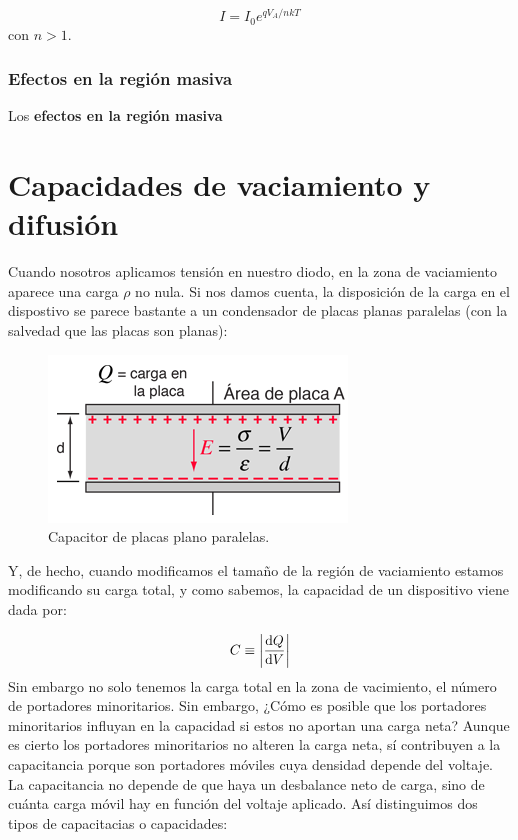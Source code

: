 \begin{equation}
    I = I_0 e^{qV_A/nkT}
\end{equation}
con $n>1$.

\subsubsection{Efectos en la región masiva}

Los \textbf{efectos en la región masiva}





\section{Capacidades de vaciamiento y difusión}

Cuando nosotros aplicamos tensión en nuestro diodo, en la zona de vaciamiento aparece una carga $\rho$ no nula. Si nos damos cuenta, la disposición de la carga en el dispostivo se parece bastante a un condensador de placas planas paralelas (con la salvedad que las placas son planas):

\begin{figure}[h!] \centering
    \includegraphics[width=0.45\linewidth]{Cuerpo/Ch_03/03_Temario_07.png}
    \caption{Capacitor de placas plano paralelas.}
\end{figure}
Y, de hecho, cuando modificamos el tamaño de la región de vaciamiento estamos modificando su carga total, y como sabemos, la capacidad de un dispositivo viene dada por: 

\begin{equation}
    C \equiv \abs{\frac{\mathrm{d} Q}{\mathrm{d} V}}
\end{equation}
Sin embargo no solo tenemos la carga total en la zona de vacimiento, el número de portadores minoritarios. Sin embargo, ¿Cómo es posible que los portadores minoritarios influyan en la capacidad si estos no aportan una carga neta? Aunque es cierto los portadores minoritarios no alteren la carga neta, sí contribuyen a la capacitancia porque son portadores móviles cuya densidad depende del voltaje. La capacitancia no depende de que haya un desbalance neto de carga, sino de cuánta carga móvil hay en función del voltaje aplicado. Así distinguimos dos tipos de capacitacias o capacidades: 

